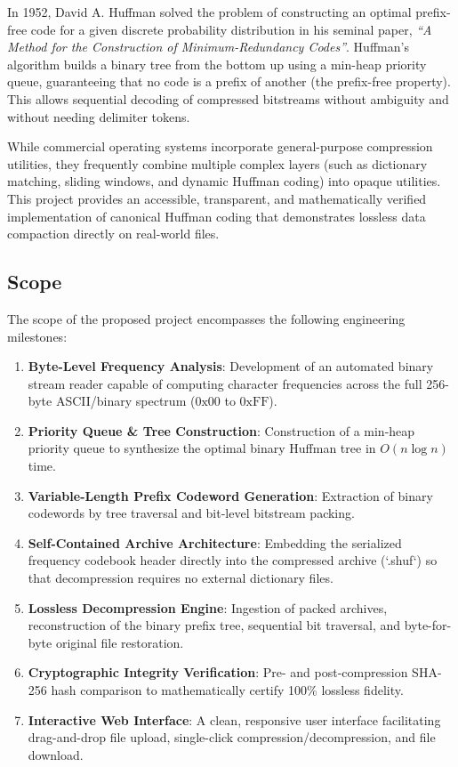 \documentclass[12pt,a4paper]{article}
\begin{document}
In 1952, David A. Huffman solved the problem of constructing an optimal prefix-free code for a given discrete probability distribution in his seminal paper, \textit{``A Method for the Construction of Minimum-Redundancy Codes''}. Huffman's algorithm builds a binary tree from the bottom up using a min-heap priority queue, guaranteeing that no code is a prefix of another (the prefix-free property). This allows sequential decoding of compressed bitstreams without ambiguity and without needing delimiter tokens.

While commercial operating systems incorporate general-purpose compression utilities, they frequently combine multiple complex layers (such as dictionary matching, sliding windows, and dynamic Huffman coding) into opaque utilities. This project provides an accessible, transparent, and mathematically verified implementation of canonical Huffman coding that demonstrates lossless data compaction directly on real-world files.

\subsection{Scope}
The scope of the proposed project encompasses the following engineering milestones:
\begin{enumerate}
    \item \textbf{Byte-Level Frequency Analysis}: Development of an automated binary stream reader capable of computing character frequencies across the full 256-byte ASCII/binary spectrum ($0\text{x}00$ to $0\text{xFF}$).
    \item \textbf{Priority Queue \& Tree Construction}: Construction of a min-heap priority queue to synthesize the optimal binary Huffman tree in $O(n \log n)$ time.
    \item \textbf{Variable-Length Prefix Codeword Generation}: Extraction of binary codewords by tree traversal and bit-level bitstream packing.
    \item \textbf{Self-Contained Archive Architecture}: Embedding the serialized frequency codebook header directly into the compressed archive (`.shuf`) so that decompression requires no external dictionary files.
    \item \textbf{Lossless Decompression Engine}: Ingestion of packed archives, reconstruction of the binary prefix tree, sequential bit traversal, and byte-for-byte original file restoration.
    \item \textbf{Cryptographic Integrity Verification}: Pre- and post-compression SHA-256 hash comparison to mathematically certify 100\% lossless fidelity.
    \item \textbf{Interactive Web Interface}: A clean, responsive user interface facilitating drag-and-drop file upload, single-click compression/decompression, and file download.
\end{enumerate}
\end{document}
